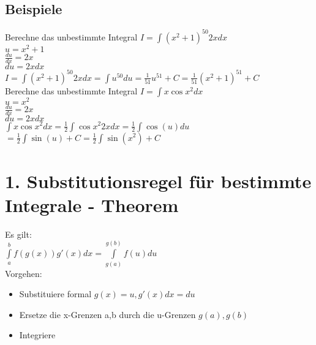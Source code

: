 \documentclass[../main.tex]{subfiles}
\begin{document}
\subsection{Beispiele}
Berechne das unbestimmte Integral $I = \int(x^2+1)^{50}2xdx$ \\
$u = x^2+1$ \\
$\frac{du}{dx} = 2x$ \\
$du = 2xdx$ \\
$I = \int(x^2+1)^{50}2xdx = \int u^{50}du = \frac{1}{51}u^{51} + C = \frac{1}{51}(x^2+1)^{51} + C$
\\ [14pt]
Berechne das unbestimmte Integral $I = \int x \cos x^2 dx$ \\
$u = x^2$ \\
$\frac{du}{dx} = 2x$ \\
$du = 2xdx$ \\
$\int x \cos x^2 dx = \frac{1}{2}\int \cos x^2 2xdx = \frac{1}{2}\int \cos (u) du$
$ =  \frac{1}{2}\int \sin (u) + C = \frac{1}{2}\int \sin (x^2) + C$

\section{1. Substitutionsregel für bestimmte Integrale - Theorem}
Es gilt: \\
$\int\limits_a^b f(g(x)) g'(x)dx = \int\limits_{g(a)}^{g(b)} f(u)du$ \\
Vorgehen:
\begin{itemize}
    \item Substituiere formal $g(x) = u, g'(x)dx = du$
    \item Ersetze die x-Grenzen a,b durch die u-Grenzen $g(a),g(b)$
    \item Integriere
\end{itemize}
\end{document}
